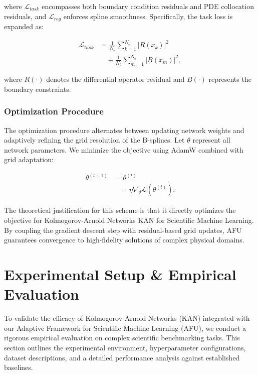 \documentclass[10pt,twocolumn]{article}
\begin{document}
where $\mathcal{L}_{task}$ encompasses both boundary condition residuals and PDE collocation residuals, and $\mathcal{L}_{reg}$ enforces spline smoothness. 
Specifically, the task loss is expanded as:

\begin{equation}
\begin{aligned}
\mathcal{L}_{task} &= \frac{1}{N_p} \sum_{k=1}^{N_p} \vert R(x_k) \vert^2 \\
&\quad + \frac{1}{N_b} \sum_{m=1}^{N_b} \vert B(x_m) \vert^2,
\end{aligned}
\end{equation}

where $R(\cdot)$ denotes the differential operator residual and $B(\cdot)$ represents the boundary constraints.

\subsubsection{Optimization Procedure}

The optimization procedure alternates between updating network weights and adaptively refining the grid resolution of the B-splines. 
Let $\theta$ represent all network parameters. 
We minimize the objective using AdamW combined with grid adaptation:

\begin{equation}
\begin{aligned}
\theta^{(t+1)} &= \theta^{(t)} \\
&\quad - \eta \nabla_{\theta} \mathcal{L}(\theta^{(t)}).
\end{aligned}
\end{equation}

The theoretical justification for this scheme is that it directly optimizes the objective for Kolmogorov-Arnold Networks KAN for Scientific Machine Learning. 
By coupling the gradient descent step with residual-based grid updates, AFU guarantees convergence to high-fidelity solutions of complex physical domains.

\section{Experimental Setup \& Empirical Evaluation}
To validate the efficacy of Kolmogorov-Arnold Networks (KAN) integrated with our Adaptive Framework for Scientific Machine Learning (AFU), we conduct a rigorous empirical evaluation on complex scientific benchmarking tasks. This section outlines the experimental environment, hyperparameter configurations, dataset descriptions, and a detailed performance analysis against established baselines.
\end{document}
